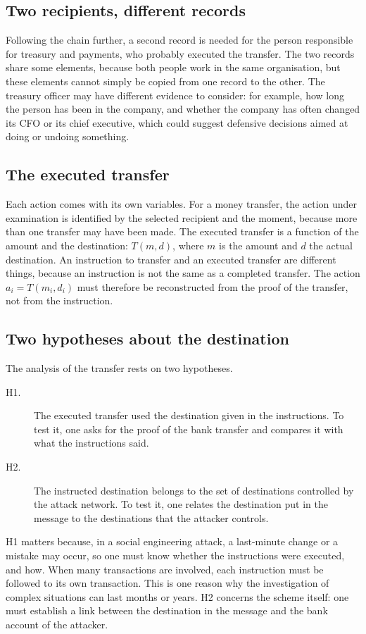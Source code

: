 \subsection{Two recipients, different records}
Following the chain further, a second record is needed for the person responsible for treasury and payments, who probably executed the transfer. The two records share some elements, because both people work in the same organisation, but these elements cannot simply be copied from one record to the other. The treasury officer may have different evidence to consider: for example, how long the person has been in the company, and whether the company has often changed its CFO or its chief executive, which could suggest defensive decisions aimed at doing or undoing something.

\subsection{The executed transfer}
Each action comes with its own variables. For a money transfer, the action under examination is identified by the selected recipient and the moment, because more than one transfer may have been made. The executed transfer is a function of the amount and the destination: $T(m, d)$, where $m$ is the amount and $d$ the actual destination. An instruction to transfer and an executed transfer are different things, because an instruction is not the same as a completed transfer. The action $a_i = T(m_i, d_i)$ must therefore be reconstructed from the proof of the transfer, not from the instruction.

\subsection{Two hypotheses about the destination}
The analysis of the transfer rests on two hypotheses.
\begin{description}
	\item[H1.] The executed transfer used the destination given in the instructions. To test it, one asks for the proof of the bank transfer and compares it with what the instructions said.
	\item[H2.] The instructed destination belongs to the set of destinations controlled by the attack network. To test it, one relates the destination put in the message to the destinations that the attacker controls.
\end{description}

H1 matters because, in a social engineering attack, a last-minute change or a mistake may occur, so one must know whether the instructions were executed, and how. When many transactions are involved, each instruction must be followed to its own transaction. This is one reason why the investigation of complex situations can last months or years. H2 concerns the scheme itself: one must establish a link between the destination in the message and the bank account of the attacker.

